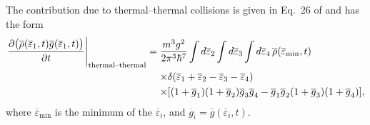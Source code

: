 The contribution due to thermal--thermal collisions is given in Eq.~26 of \citep{Bijlsma:2000} and has the form
\begin{align}
    \begin{split}
        \left. \frac{\partial\big(\overline{\rho}(\overline{\varepsilon}_1, t) \overline{g}(\overline{\varepsilon}_1, t)\big)}{\partial t}\right|_\text{thermal--thermal} &= \frac{m^3 g^2}{2 \pi^3 \hbar^7} \int d\overline{\varepsilon}_2 \int d\overline{\varepsilon}_3 \int d\overline{\varepsilon}_4 \,\overline{\rho}(\overline{\varepsilon}_\text{min}, t)\\
        &\relphantom{=} \times\delta(\overline{\varepsilon}_1 + \overline{\varepsilon}_2 - \overline{\varepsilon}_3 - \overline{\varepsilon}_4) \\
        &\relphantom{=} \times [ (1+\overline{g}_1) (1+\overline{g}_2) \overline{g}_3 \overline{g}_4 - \overline{g}_1 \overline{g}_2 (1+\overline{g}_3) (1+\overline{g}_4)],
    \end{split}
\end{align}
where $\overline{\varepsilon}_\text{min}$ is the minimum of the $\overline{\varepsilon}_i$, and $\overline{g}_i = \overline{g}(\overline{\varepsilon}_i, t)$. 

